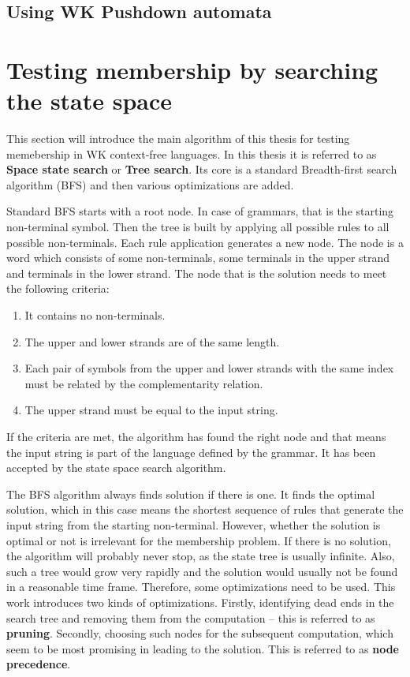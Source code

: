 \section{Using WK Pushdown automata}

\chapter{Testing membership by searching the state space} \label{chapter:parse_tree}
This section will introduce the main algorithm of this thesis for testing memebership in WK context-free languages. In this thesis it is referred to as \textbf{Space state search} or \textbf{Tree search}. Its core is a standard Breadth-first search algorithm (BFS) and then various optimizations are added.

Standard BFS starts with a root node. In case of grammars, that is the starting non-terminal symbol. Then the tree is built by applying all possible rules to all possible non-terminals. Each rule application generates a new node. The node is a word which consists of some non-terminals, some terminals in the upper strand and terminals in the lower strand. The node that is the solution needs to meet the following criteria:
\begin{enumerate}
  \item{It contains no non-terminals.}
  \item{The upper and lower strands are of the same length.}
  \item{Each pair of symbols from the upper and lower strands with the same index must be related by the complementarity relation.}
  \item{The upper strand must be equal to the input string.}
\end{enumerate}
If the criteria are met, the algorithm has found the right node and that means the input string is part of the language defined by the grammar. It has been accepted by the state space search algorithm.

The BFS algorithm always finds solution if there is one. It finds the optimal solution, which in this case means the shortest sequence of rules that generate the input string from the starting non-terminal. However, whether the solution is optimal or not is irrelevant for the membership problem. If there is no solution, the algorithm will probably never stop, as the state tree is usually infinite. Also, such a tree would grow very rapidly and the solution would usually not be found in a reasonable time frame. Therefore, some optimizations need to be used. This work introduces two kinds of optimizations. Firstly, identifying dead ends in the search tree and removing them from the computation -- this is referred to as \textbf{pruning}. Secondly, choosing such nodes for the subsequent computation, which seem to be most promising in leading to the solution. This is referred to as \textbf{node precedence}.

